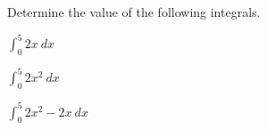 
\begin{problem}
  \item Determine the value of the following integrals.
    \begin{subproblem}
    \item $\int^5_0 2x ~ dx$
      \vfill
    \item $\int^5_0 2x^2 ~ dx$
      \vfill
    \item $\int^5_0 2x^2 - 2x ~ dx$
      \vfill
    \end{subproblem}
\end{problem}



